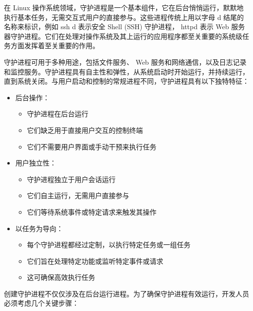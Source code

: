 在 Linux 操作系统领域，守护进程是一个基本组件，它在后台悄悄运行，默默地执行基本任务，无需交互式用户的直接参与。这些进程传统上用以字母 d 结尾的名称来标识，例如 ssh d 表示安全 Shell (SSH) 守护进程， httpd 表示 Web 服务器守护进程。它们在处理对操作系统及其上运行的应用程序都至关重要的系统级任务方面发挥着至关重要的作用。

守护进程可用于多种用途，包括文件服务、 Web 服务和网络通信，以及日志记录和监控服务。守护进程具有自主性和弹性，从系统启动时开始运行，并持续运行，直到系统关闭。与用户启动和控制的常规进程不同，守护进程具有以下独特特征：

\begin{itemize}
\item
后台操作：
\begin{itemize}
\item
守护进程在后台运行

\item
它们缺乏用于直接用户交互的控制终端

\item
它们不需要用户界面或手动干预来执行任务
\end{itemize}

\item
用户独立性：
\begin{itemize}
\item
守护进程独立于用户会话运行

\item
它们自主运行，无需用户直接参与

\item
它们等待系统事件或特定请求来触发其操作
\end{itemize}

\item
以任务为导向：
\begin{itemize}
\item
每个守护进程都经过定制，以执行特定任务或一组任务

\item
它们旨在处理特定功能或监听特定事件或请求

\item
这可确保高效执行任务
\end{itemize}
\end{itemize}

创建守护进程不仅仅涉及在后台运行进程。为了确保守护进程有效运行，开发人员必须考虑几个关键步骤：

